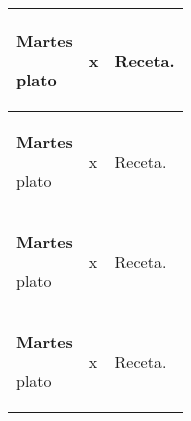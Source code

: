 \documentclass[menu.tex]{subfiles}
\begin{document}
\begin{tabular} {p{3.5cm} p{4cm} p{9cm}}
\pbox{20cm}
{
    \rule{0pt}{3ex}\begin{large}\textbf{Martes}\end{large}\\ 
    \rule{0pt}{2ex}plato
} & 
\vspace{-0.1cm}            
\begin{compactitem} 
    \begin{scriptsize}
        \item x
    \end{scriptsize}
\end{compactitem}&
\vspace{-0.1cm}            
Receta.\\
\hline

\pbox{20cm}
{
    \rule{0pt}{3ex}\begin{large}\textbf{Martes}\end{large}\\ 
    \rule{0pt}{2ex}plato
} & 
\vspace{-0.1cm}                      
\begin{compactitem} 
    \begin{scriptsize}
        \item x
    \end{scriptsize}
\end{compactitem}&
\vspace{-0.1cm}            
Receta.\\

\hline

\pbox{20cm}
{
    \rule{0pt}{3ex}\begin{large}\textbf{Martes}\end{large}\\ 
    \rule{0pt}{2ex}plato 
} & 
\vspace{-0.1cm}                       
\begin{compactitem} 
    \begin{scriptsize}
        \item x
    \end{scriptsize}
\end{compactitem}&
\vspace{-0.1cm}            
Receta.\\
\hline

\pbox{20cm}
{
    \rule{0pt}{3ex}\begin{large}\textbf{Martes}\end{large}\\ 
    \rule{0pt}{2ex}plato
} & 
\vspace{-0.1cm}            
\begin{compactitem} 
    \begin{scriptsize}
        \item x
    \end{scriptsize}
\end{compactitem}&
\vspace{-0.1cm}
Receta.\\
\hline


\end{tabular}
\end{document}
